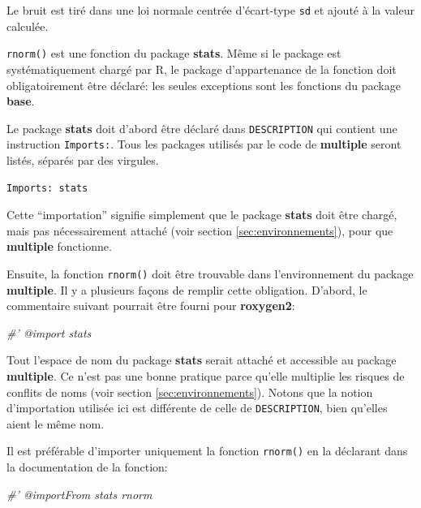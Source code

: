 \documentclass[
  12pt,
  french,
  a4paper,
  extrafontsizes,onecolumn,openright
  ]{memoir}
\newenvironment{Shaded}{\begin{snugshade}}{\end{snugshade}}
\newcommand{\CommentTok}[1]{\textcolor[rgb]{0.56,0.35,0.01}{\textit{#1}}}
\begin{document}
\normalsize

Le bruit est tiré dans une loi normale centrée d'écart-type \texttt{sd} et ajouté à la valeur calculée.

\texttt{rnorm()} est une fonction du package \textbf{stats}.
Même si le package est systématiquement chargé par R, le package d'appartenance de la fonction doit obligatoirement être déclaré: les seules exceptions sont les fonctions du package \textbf{base}.

Le package \textbf{stats} doit d'abord être déclaré dans \texttt{DESCRIPTION} qui contient une instruction \texttt{Imports:}.
Tous les packages utilisés par le code de \textbf{multiple} seront listés, séparés par des virgules.

\begin{verbatim}
Imports: stats
\end{verbatim}

Cette \enquote{importation} signifie simplement que le package \textbf{stats} doit être chargé, mais pas nécessairement attaché (voir section \ref{sec:environnements}), pour que \textbf{multiple} fonctionne.

Ensuite, la fonction \texttt{rnorm()} doit être trouvable dans l'environnement du package \textbf{multiple}.
Il y a plusieurs façons de remplir cette obligation.
D'abord, le commentaire suivant pourrait être fourni pour \textbf{roxygen2}:

\scriptsize

\begin{Shaded}
\begin{Highlighting}[]
\CommentTok{#' @import stats}
\end{Highlighting}
\end{Shaded}

\normalsize

Tout l'espace de nom du package \textbf{stats} serait attaché et accessible au package \textbf{multiple}.
Ce n'est pas une bonne pratique parce qu'elle multiplie les risques de conflits de noms (voir section \ref{sec:environnements}).
Notons que la notion d'importation utilisée ici est différente de celle de \texttt{DESCRIPTION}, bien qu'elles aient le même nom.

Il est préférable d'importer uniquement la fonction \texttt{rnorm()} en la déclarant dans la documentation de la fonction:

\scriptsize

\begin{Shaded}
\begin{Highlighting}[]
\CommentTok{#' @importFrom stats rnorm}
\end{Highlighting}
\end{Shaded}
\end{document}
